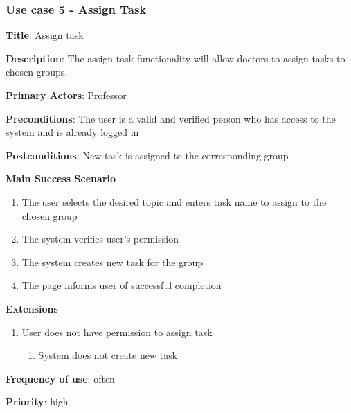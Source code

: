 \documentclass[singlespacing,12pt,parskip,headsepline,consistentlayout]{article}
\begin{document}
\subsubsection{Use case 5 - Assign Task}
\begin{flushleft}
\vspace{0.2cm}
\hline
\vspace{0.2cm}
{\bfseries Title}: {Assign task}

{\bfseries Description}: {The assign task functionality will allow doctors to assign tasks to chosen groups.}

{\bfseries Primary Actors}: {Professor}

{\bfseries Preconditions}: The user is a valid and verified person who has access to the system and is already logged in

{\bfseries Postconditions}: {New task is assigned to the corresponding group}

{\bfseries Main Success Scenario}

\begin{enumerate}
      \item The user selects the desired topic and enters task name to assign to the chosen group
      \item The system verifies user’s permission
      \item The system creates new task for the group
      \item The page informs user of successful completion
\end{enumerate}
 
{\bfseries Extensions}

\begin{enumerate}
  \item User does not have permission to assign task
  \begin{enumerate}
      \item System does not create new task
  \end{enumerate}
\end{enumerate}

{\bfseries Frequency of use}: often

{\bfseries Priority}: high

\end{flushleft}

\pagebreak
\end{document}
